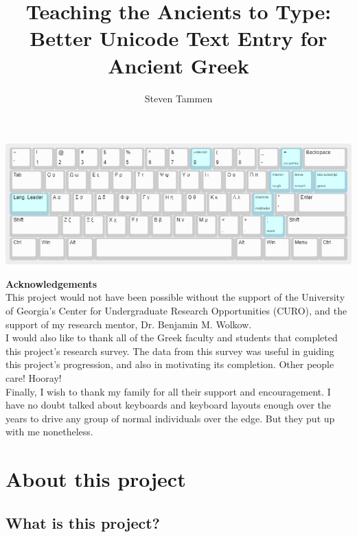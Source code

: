 \documentclass[11pt]{article}
\author{Steven Tammen}
\date{}
\title{Teaching the Ancients to Type: Better Unicode Text Entry for Ancient Greek}
\begin{document}
\maketitle
\bigskip
\bigskip
\bigskip
\bigskip
\bigskip
\begin{center}
\includegraphics[width=.9\linewidth]{./images/greek-layer.png}
\end{center}

\newpage
\noindent \textbf{Acknowledgements} \\

\noindent This project would not have been possible without the support of the University of Georgia's Center for Undergraduate Research Opportunities (CURO), and the support of my research mentor, Dr. Benjamin M. Wolkow. \\

\noindent I would also like to thank all of the Greek faculty and students that completed this project's research survey. The data from this survey was useful in guiding this project's progression, and also in motivating its completion. Other people care! Hooray! \\

\noindent Finally, I wish to thank my family for all their support and encouragement. I have no doubt talked about keyboards and keyboard layouts enough over the years to drive any group of normal individuals over the edge. But they put up with me nonetheless.

\newpage
\setcounter{tocdepth}{2}
\tableofcontents

\newpage
{}

\section{About this project}
\label{sec:org87caff2}

\subsection{What is this project?}
\label{sec:org242a507}
\end{document}
